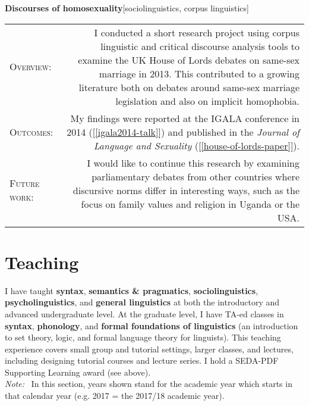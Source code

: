 \documentclass[11pt,a4paper]{article}
\makeatletter
\newlength{\rulelength}%
\newcommand{\REx}[2]{%
\vspace*{0.1\baselineskip}%
{\large\textbf{#1}\hfill\textnormal{[#2]}}%
\vspace*{0.5\baselineskip}%
}
\newenvironment{cvsection}{%
  \setlength{\extrarowheight}{0.70ex}
  \begin{longtable}[l]{@{} L R @{}}
}{%
  \end{longtable}
}
\newcommand{\sref}[1]{[\ref{#1}]}
\newcommand{\note}{\emph{Note: }}
\newcommand{\subhead}[1]{%
\textsc{#1}:%
}
\makeatother
\begin{document}
\REx{Discourses of homosexuality}{sociolinguistics, corpus linguistics}
\begin{cvsection}
  \subhead{Overview} &%
  I conducted a short research project using corpus linguistic and critical discourse analysis tools to examine the UK House of Lords debates on same-sex marriage in 2013. This contributed to a growing literature both on debates around same-sex marriage legislation and also on implicit homophobia.%
\\
  \subhead{Outcomes} &%
  My findings were reported at the IGALA conference in 2014 (\sref{igala2014-talk}) and published in the \textit{Journal of Language and Sexuality} (\sref{house-of-lords-paper}).%
\\
  \subhead{Future work} &%
  I would like to continue this research by examining parliamentary debates from other countries where discursive norms differ in interesting ways, such as the focus on family values and religion in Uganda or the USA.
\end{cvsection}


\newpage

\section*{Teaching}

I have taught \textbf{syntax}, \textbf{semantics \& pragmatics}, \textbf{sociolinguistics}, \textbf{psycholinguistics}, and \textbf{general linguistics} at both the introductory and advanced undergraduate level. At the graduate level, I have TA-ed classes in \textbf{syntax}, \textbf{phonology}, and \textbf{formal foundations of linguistics} (an introduction to set theory, logic, and formal language theory for linguists). This teaching experience covers small group and tutorial settings, larger classes, and lectures, including designing tutorial courses and lecture series. I hold a SEDA-PDF Supporting Learning award (see above).
\\[1em]
\note\ In this section, years shown stand for the academic year which starts in that calendar year (e.g. 2017 = the 2017/18 academic year).
\end{document}
